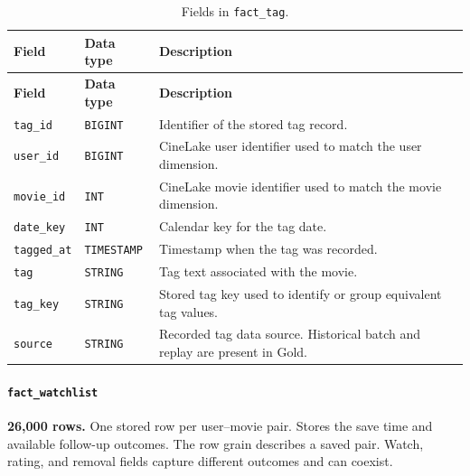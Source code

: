 \documentclass[a4paper,12pt]{article}
\newcommand{\dbsep}{\_\allowbreak}
\begin{document}
\begingroup
\small
\setlength{\tabcolsep}{4pt}
\renewcommand{\arraystretch}{1.1}
\begin{longtable}{@{}>{\raggedright\arraybackslash}p{}
                    >{\raggedright\arraybackslash}p{}
                    >{\raggedright\arraybackslash}p{}@{}}
\caption{Fields in \texttt{fact\dbsep tag}.}\\
\toprule
\textbf{Field} & \textbf{Data type} & \textbf{Description}\\
\midrule
\endfirsthead
\toprule
\textbf{Field} & \textbf{Data type} & \textbf{Description}\\
\midrule
\endhead
\bottomrule
\endfoot
\texttt{tag\dbsep id} & \texttt{BIGINT} & Identifier of the stored tag record.\\
\texttt{user\dbsep id} & \texttt{BIGINT} & CineLake user identifier used to match the user dimension.\\
\texttt{movie\dbsep id} & \texttt{INT} & CineLake movie identifier used to match the movie dimension.\\
\texttt{date\dbsep key} & \texttt{INT} & Calendar key for the tag date.\\
\texttt{tagged\dbsep at} & \texttt{TIMESTAMP} & Timestamp when the tag was recorded.\\
\texttt{tag} & \texttt{STRING} & Tag text associated with the movie.\\
\texttt{tag\dbsep key} & \texttt{STRING} & Stored tag key used to identify or group equivalent tag values.\\
\texttt{source} & \texttt{STRING} & Recorded tag data source. Historical batch and replay are present in Gold.\\
\end{longtable}
\endgroup

\paragraph{\texttt{fact\dbsep watchlist}}
\textbf{26,000 rows.} One stored row per user--movie pair.
Stores the save time and available follow-up outcomes. The row grain describes a saved pair. Watch, rating, and removal fields capture different outcomes and can coexist.
\end{document}
